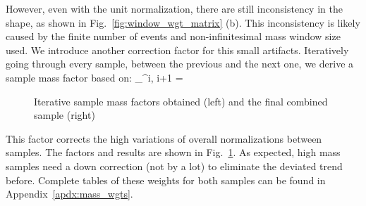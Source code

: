 However, even with the unit normalization, there are still inconsistency in the shape, as shown
in Fig.~\ref{fig:window_wgt_matrix} (b). This inconsistency is likely caused by the finite number of events
and non-infinitesimal mass window size used. We introduce another correction factor for
this small artifacts. Iteratively going through every sample, between the previous and the
next one, we derive a sample mass factor based on:
\be
{}_^{i, i+1} = 
\ee

\begin{figure}[htb]
    \begin{center}
    \end{center}
    \caption{Iterative sample mass factors obtained (left) and the final combined sample (right)}
    \label{fig:LHE_rewgt}
\end{figure}

This factor corrects the high variations of overall normalizations between samples. The factors and results
are shown in Fig.~\ref{fig:LHE_rewgt}. As expected, high mass samples need a down correction (not by a lot)
to eliminate the deviated trend before. Complete tables of these weights for both samples can be found
in Appendix~\ref{apdx:mass_wgts}.

